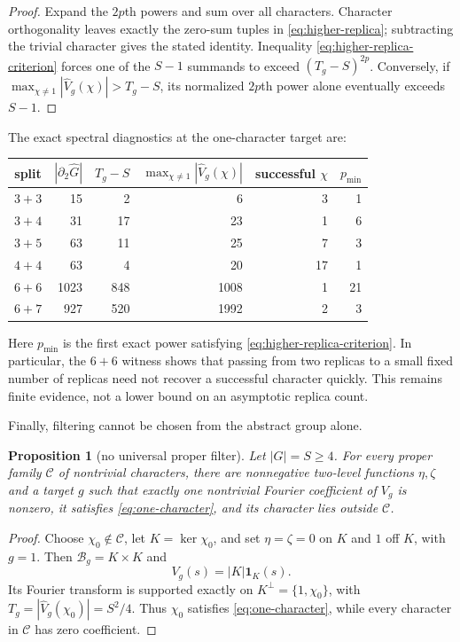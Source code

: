 \documentclass[11pt]{article}
\newtheorem{proposition}[theorem]{Proposition}
\theoremstyle{definition}
\theoremstyle{remark}
\begin{document}
\begin{proof}
Expand the $2p$th powers and sum over all characters.  Character
orthogonality leaves exactly the zero-sum tuples in
\eqref{eq:higher-replica}; subtracting the trivial character gives the stated
identity.  Inequality \eqref{eq:higher-replica-criterion} forces one of the
$S-1$ summands to exceed $(T_g-S)^{2p}$.  Conversely, if
$\max_{\chi\ne1}|\widehat V_g(\chi)|>T_g-S$, its normalized $2p$th power
alone eventually exceeds $S-1$.
\end{proof}

The exact spectral diagnostics at the one-character target are:
\begin{center}
\begin{tabular}{c|rrrrr}
\toprule
split & $|\partial_2\widehat G|$ & $T_g-S$ &
$\max_{\chi\ne1}|\widehat V_g(\chi)|$ & successful $\chi$ & $p_{\min}$\\
\midrule
$3+3$ &15&2&6&3&1\\
$3+4$ &31&17&23&1&6\\
$3+5$ &63&11&25&7&3\\
$4+4$ &63&4&20&17&1\\
$6+6$ &1023&848&1008&1&21\\
$6+7$ &927&520&1992&2&3\\
\bottomrule
\end{tabular}
\end{center}
Here $p_{\min}$ is the first exact power satisfying
\eqref{eq:higher-replica-criterion}.  In particular, the $6+6$ witness shows
that passing from two replicas to a small fixed number of replicas need not
recover a successful character quickly.  This remains finite evidence, not a
lower bound on an asymptotic replica count.

Finally, filtering cannot be chosen from the abstract group alone.

\begin{proposition}[no universal proper filter]\label{prop:no-fixed-filter}
Let $|G|=S\ge4$.  For every proper family $\mathcal C$ of nontrivial
characters, there are nonnegative two-level functions $\eta,\zeta$ and a
target $g$ such that exactly one nontrivial Fourier coefficient of $V_g$ is
nonzero, it satisfies \eqref{eq:one-character}, and its character lies
outside $\mathcal C$.
\end{proposition}

\begin{proof}
Choose $\chi_0\notin\mathcal C$, let $K=\ker\chi_0$, and set
$\eta=\zeta=0$ on $K$ and $1$ off $K$, with $g=1$.  Then
$\mathcal B_g=K\times K$ and
\[
 V_g(s)=|K|\mathbf1_K(s).
\]
Its Fourier transform is supported exactly on
$K^\perp=\{1,\chi_0\}$, with
$T_g=|\widehat V_g(\chi_0)|=S^2/4$.  Thus $\chi_0$ satisfies
\eqref{eq:one-character}, while every character in $\mathcal C$ has zero
coefficient.
\end{proof}
\end{document}
